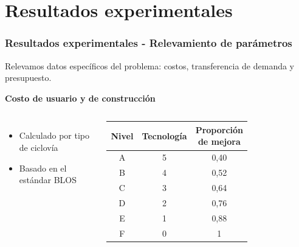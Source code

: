 \documentclass[aspectratio=43, 10pt]{beamer}
\begin{document}
\section{Resultados experimentales}

\begin{frame}
    \frametitle{Resultados experimentales - Relevamiento de parámetros}

    Relevamos datos específicos del problema: costos, transferencia de demanda y presupuesto.

    \textbf{Costo de usuario y de construcción}
    \begin{columns}[T]
        \begin{itemize}
            \item Calculado por tipo de ciclovía
            \item Basado en el estándar BLOS \parencite{blos2007}
        \end{itemize}
        \begin{tabular}{ccc}
          Nivel & Tecnología & \shortstack{Proporción \\ de mejora} \\
          \hline\hline
          A & 5 & 0,40  \\
          B & 4 & 0,52  \\
          C & 3 & 0,64  \\
          D & 2 & 0,76  \\
          E & 1 & 0,88  \\
          F & 0 & 1     \\
          \hline
      \end{tabular}
    \end{columns}
\end{frame}
\end{document}
